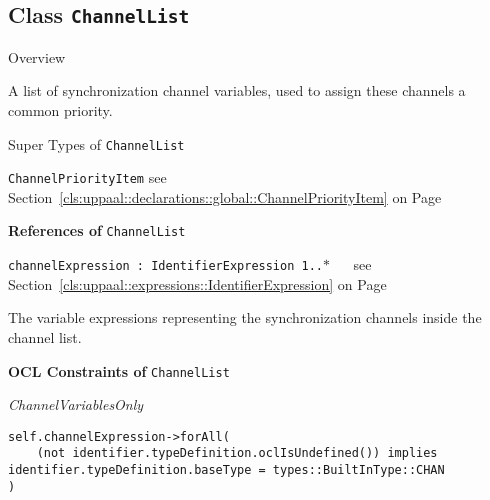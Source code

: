 \subsection{Class \bfseries \texttt{ChannelList}\normalfont}
\label{cls:uppaal::declarations::global::ChannelList} 
	
	\begin{longdescription}
		\item[Overview] 		
				

	

		A list of synchronization channel variables, used to assign these channels a common priority.		
		\item[Super Types of \texttt{ChannelList}] ~
			\begin{longdescription}
				\item[\texttt{ChannelPriorityItem}] see Section~\ref{cls:uppaal::declarations::global::ChannelPriorityItem} on Page~\pageref{cls:uppaal::declarations::global::ChannelPriorityItem}						\end{longdescription}
		
	
			\item[\textbf{References of} \texttt{ChannelList}] ~
			\begin{longdescription}
	\item[\texttt{channelExpression : IdentifierExpression 	\symbol{"5B}1..$*$\symbol{"5D}
}] ~
	see Section~\ref{cls:uppaal::expressions::IdentifierExpression} on Page~\pageref{cls:uppaal::expressions::IdentifierExpression}
	
	\nopagebreak
		
				

	

		The variable expressions representing the synchronization channels inside the channel list.		
			\end{longdescription}
			\item[\textbf{OCL Constraints of} \texttt{ChannelList}] ~
			\begin{longdescription}
	\item[\small\textit{ChannelVariablesOnly}] ~ 
	\nopagebreak
	
		\begin{lstlisting}[breaklines=true]
self.channelExpression->forAll(
	(not identifier.typeDefinition.oclIsUndefined()) implies identifier.typeDefinition.baseType = types::BuiltInType::CHAN
)		\end{lstlisting}
			\end{longdescription}
	
	\end{longdescription}
	

